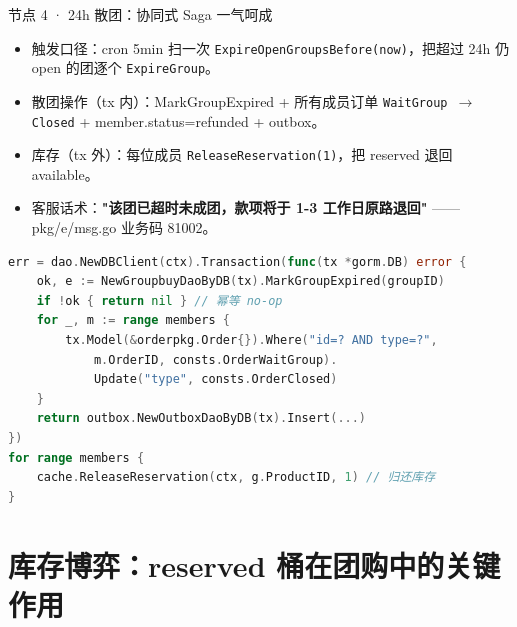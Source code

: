 \documentclass[aspectratio=169,11pt]{beamer}
\begin{document}
\begin{frame}{节点 4 · 24h 散团：协同式 Saga 一气呵成}
\begin{itemize}
  \item 触发口径：cron 5min 扫一次 \texttt{ExpireOpenGroupsBefore(now)}，把超过 24h 仍 open 的团逐个 \texttt{ExpireGroup}。
  \item 散团操作（tx 内）：MarkGroupExpired + 所有成员订单 \texttt{WaitGroup $\to$ Closed} + member.status=refunded + outbox。
  \item 库存（tx 外）：每位成员 \texttt{ReleaseReservation(1)}，把 reserved 退回 available。
  \item 客服话术：\textbf{"该团已超时未成团，款项将于 1-3 工作日原路退回"} —— pkg/e/msg.go 业务码 81002。
\end{itemize}
\begin{lstlisting}[language=Go,caption={ExpireGroup Saga 散团 internal/groupbuy/service.go}]
err = dao.NewDBClient(ctx).Transaction(func(tx *gorm.DB) error {
    ok, e := NewGroupbuyDaoByDB(tx).MarkGroupExpired(groupID)
    if !ok { return nil } // 幂等 no-op
    for _, m := range members {
        tx.Model(&orderpkg.Order{}).Where("id=? AND type=?",
            m.OrderID, consts.OrderWaitGroup).
            Update("type", consts.OrderClosed)
    }
    return outbox.NewOutboxDaoByDB(tx).Insert(...)
})
for range members {
    cache.ReleaseReservation(ctx, g.ProductID, 1) // 归还库存
}
\end{lstlisting}
\end{frame}

\section{库存博弈：reserved 桶在团购中的关键作用}
\end{document}
